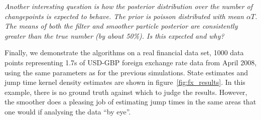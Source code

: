 \documentclass[journal]{IEEEtran}
\newenvironment{meta}[0]{\color{red} \em}{}
\begin{document}
\begin{meta}
Another interesting question is how the posterior distribution over the number of changepoints is expected to behave. The prior is poisson distributed with mean $\alpha T$. The means of both the filter and smoother particle posterior are consistently greater than the true number (by about 50\%). Is this expected and why?
\end{meta}

Finally, we demonstrate the algorithms on a real financial data set, 1000 data points representing 1.7s of USD-GBP foreign exchange rate data from April 2008, using the same parameters as for the previous simulations. State estimates and jump time kernel density estimates are shown in figure~\ref{fig:fx_results}. In this example, there is no ground truth against which to judge the results. However, the smoother does a pleasing job of estimating jump times in the same areas that one would if analysing the data ``by eye''.
\end{document}
